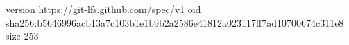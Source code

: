 version https://git-lfs.github.com/spec/v1
oid sha256:b5646996acb13a7c103b1e1b9b2a2586e41812a023117ff7ad10700674c311e8
size 253
